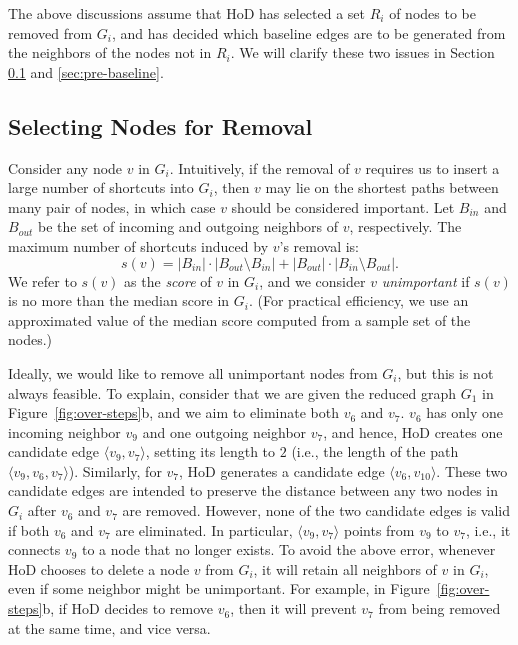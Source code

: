 \documentclass{sig-alternate}
\begin{document}
\begin{sloppy}
The above discussions assume that HoD has selected a set $R_i$ of nodes to be removed from $G_i$, and has decided which baseline edges are to be generated from the neighbors of the nodes not in $R_i$. We will clarify these two issues in Section \ref{sec:pre-select} and \ref{sec:pre-baseline}.



\subsection{Selecting Nodes for Removal} \label{sec:pre-select}

Consider any node $v$ in $G_i$. Intuitively, if the removal of $v$ requires us to insert a large number of shortcuts into $G_i$, then $v$ may lie on the shortest paths between many pair of nodes, in which case $v$ should be considered important. Let $B_{in}$ and $B_{out}$ be the set of incoming and outgoing neighbors of $v$, respectively. The maximum number of shortcuts induced by $v$'s removal is:
\begin{equation} \label{eqn:pre-score}
s(v) = {\big |}B_{in}{\big |} \cdot {\big |}B_{out} \setminus B_{in}{\big |} + {\big |}B_{out}{\big |} \cdot {\big |}B_{in} \setminus B_{out}{\big |}.
\end{equation}
We refer to $s(v)$ as the {\em score} of $v$ in $G_i$, and we consider $v$ {\em unimportant} if $s(v)$ is no more than the median score in $G_i$. (For practical efficiency, we use an approximated value of the median score computed from a sample set of the nodes.)


Ideally, we would like to remove all unimportant nodes from $G_i$, but this is not always feasible. To explain, consider that we are given the reduced graph $G_1$ in Figure~\ref{fig:over-steps}b, and we aim to eliminate both $v_6$ and $v_7$. $v_6$ has only one incoming neighbor $v_9$ and one outgoing neighbor $v_7$, and hence, HoD creates one candidate edge $\langle v_9, v_7\rangle$, setting its length to $2$ (i.e., the length of the path $\langle v_9, v_6, v_7\rangle$). Similarly, for $v_7$, HoD generates a candidate edge $\langle v_6, v_{10}\rangle$. These two candidate edges are intended to preserve the distance between any two nodes in $G_i$ after $v_6$ and $v_7$ are removed. However, none of the two candidate edges is valid if both $v_6$ and $v_7$ are eliminated. In particular, $\langle v_9, v_7\rangle$ points from $v_9$ to $v_7$, i.e., it connects $v_9$ to a node that no longer exists. To avoid the above error, whenever HoD chooses to delete a node $v$ from $G_i$, it will retain all neighbors of $v$ in $G_i$, even if some neighbor might be unimportant. For example, in Figure~\ref{fig:over-steps}b, if HoD decides to remove $v_6$, then it will prevent $v_7$ from being removed at the same time, and vice versa.


\end{sloppy}
\end{document}
